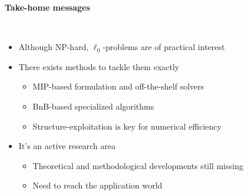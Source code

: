 \begin{frame}
    \begin{center}
        \Large{\textbf{Take-home messages}}
    \end{center}
    ~\\
    \begin{itemize}[label=\textbullet]
        \item Although \textcolor{TolLightOrange}{NP-hard}, $\ell_0$-problems are of \textcolor{TolLightOrange}{practical interest}
        \item There exists methods to tackle them exactly
        \begin{itemize}[label=\textbullet]
        \item \textcolor{TolLightOrange}{MIP-based} formulation and off-the-shelf solvers
        \item \textcolor{TolLightOrange}{BnB-based} specialized algorithms
        \item Structure-exploitation is key for numerical efficiency
        \end{itemize}
        \item It's an active research area
        \begin{itemize}[label=\textbullet]
        \item Theoretical and methodological developments still missing
        \item Need to reach the application world
        \end{itemize}
    \end{itemize}
\end{frame}